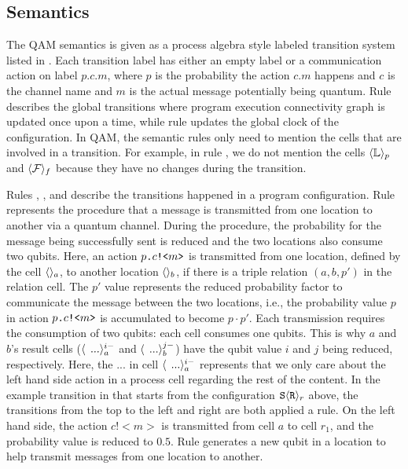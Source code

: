 \subsection{Semantics} \label{sec:qamsemantics}

The QAM semantics is given as a process algebra style labeled transition system listed in .
Each transition label has either an empty label or a communication action on label $p.c.m$, where $p$ is the probability the action $c.m$ happens and $c$ is the channel name and $m$ is the actual message potentially being quantum.
Rule  describes the global transitions where program execution connectivity graph is updated once upon a time,
while rule  updates the global clock of the configuration.
In QAM, the semantic rules only need to mention the cells that are involved in a transition.
For example, in rule , we do not mention the cells $\langle \mathbb{L} \rangle_{p}$ and $\langle \mathcal{F} \rangle_{f}$ because they have no changes during the transition.

Rules , , and  describe the transitions happened in a program configuration.
Rule  represents the procedure that a message is transmitted from one location to another via a quantum channel. During the procedure, the probability for the message being successfully sent is reduced and the two locations also consume two qubits.
Here, an action $p\texttt{.}c\texttt{!<}m\texttt{>}$ is transmitted from one location, defined by the cell $\langle  \rangle_a$, to another location $\langle  \rangle_b$, if there is a triple relation $(a,b,p')$ in the relation cell. 
The $p'$ value represents the reduced probability factor to communicate the message between the two locations, i.e.,
the probability value $p$ in action $p\texttt{.}c\texttt{!<}m\texttt{>}$ is accumulated to become $p\cdot p'$.
Each transmission requires the consumption of two qubits: each cell consumes one qubits.
This is why $a$ and $b$'s result cells ($\langle  \, \;...\rangle^{i-}_{a}$ and $\langle  \, \;...\rangle^{j-}_{b}$) have the qubit value $i$ and $j$ being reduced, respectively.
Here, the $...$ in cell $\langle  \, \;...\rangle^{i-}_{a}$ represents that we only care about the left hand side action in a process cell regarding the rest of the content.
In the example transition in  that starts from the configuration $\texttt{S} \langle \texttt{R} \rangle_r$ above,
the transitions from the top to the left and right are both applied a  rule.
On the left hand side, the action $c!<m>$ is transmitted from cell $a$ to cell $r_1$, and the probability value is reduced to $0.5$.
Rule  generates a new qubit in a location to help transmit messages from one location to another.

